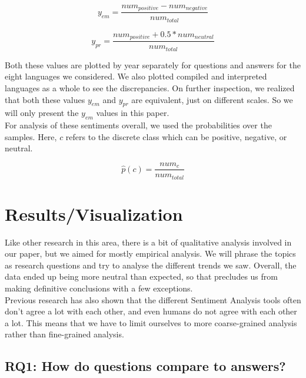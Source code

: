 \documentclass[conference]{IEEEtran}
\begin{document}
\begin{equation}
    y_{em} = \frac{num_{positive} - num_{negative}}{num_{total}}
\end{equation}

\begin{equation}
    y_{pr} = \frac{num_{positive} + 0.5*num_{neutral}}{num_{total}}
\end{equation}

Both these values are plotted by year separately for questions and answers for the eight languages we considered. We also plotted compiled and interpreted languages as a whole to see the discrepancies. On further inspection, we realized that both these values $y_{em}$ and $y_{pr}$ are equivalent, just on different scales. So we will only present the $y_{em}$ values in this paper. \\

For analysis of these sentiments overall, we used the probabilities over the samples. Here, $c$ refers to the discrete class which can be positive, negative, or neutral.

\begin{equation}
    \hat{p}(c) = \frac{num_c}{num_{total}}
\end{equation}

\vspace{8pt}
\section{Results/Visualization}
Like other research in this area, there is a bit of qualitative analysis involved in our paper, but we aimed for mostly empirical analysis. We will phrase the topics as research questions and try to analyse the different trends we saw. Overall, the data ended up being more neutral than expected, so that precludes us from making definitive conclusions with a few exceptions. \\

Previous research has also shown that the different Sentiment Analysis tools often don't agree a lot with each other, and even humans do not agree with each other a lot. This means that we have to limit ourselves to more coarse-grained analysis rather than fine-grained analysis\cite{b26, b35, b36}. \\

\subsection{RQ1: How do questions compare to answers?}
\end{document}
